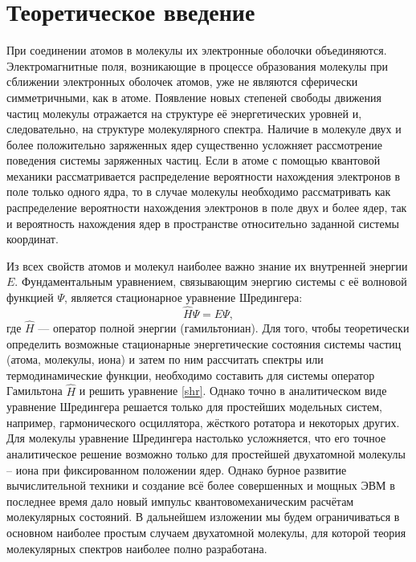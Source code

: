 \section{Теоретическое введение}
При соединении атомов в молекулы их электронные оболочки объединяются.
Электромагнитные поля, возникающие в процессе образования молекулы при
сближении электронных оболочек атомов, уже не являются сферически
симметричными, как в атоме. Появление новых степеней свободы движения
частиц молекулы отражается на структуре её энергетических уровней и,
следовательно, на структуре молекулярного спектра. Наличие в молекуле двух
и более положительно заряженных ядер существенно усложняет рассмотрение
поведения системы заряженных частиц. Если в атоме с помощью квантовой
механики рассматривается распределение вероятности нахождения электронов
в поле только одного ядра, то в случае молекулы необходимо рассматривать
как распределение вероятности нахождения электронов в поле двух и более
ядер, так и вероятность нахождения ядер в пространстве относительно
заданной системы координат.

Из всех свойств атомов и молекул наиболее важно знание их внутренней
энергии $E$. Фундаментальным уравнением, связывающим энергию системы с её
волновой функцией $\Psi$, является стационарное уравнение Шредингера:
\begin{equation}
\label{shr}
\hat H\Psi=E\Psi,
\end{equation}
где $\hat H$ --- оператор полной энергии (гамильтониан). Для того, чтобы
теоретически определить возможные стационарные энергетические состояния
системы частиц (атома, молекулы, иона) и затем по ним рассчитать спектры
или термодинамические функции, необходимо составить для системы оператор
Гамильтона $\hat H$ и решить уравнение \eqref{shr}. Однако точно в аналитическом виде
уравнение Шредингера решается только для простейших модельных систем,
например, гармонического осциллятора, жёсткого ротатора и некоторых
других. Для молекулы уравнение Шредингера настолько усложняется, что его
точное аналитическое решение возможно только для простейшей двухатомной
молекулы – иона при фиксированном положении ядер. Однако бурное
развитие вычислительной техники и создание всё более совершенных и
мощных ЭВМ в последнее время дало новый импульс квантовомеханическим
расчётам молекулярных состояний. В дальнейшем изложении мы будем
ограничиваться в основном наиболее простым случаем двухатомной молекулы,
для которой теория молекулярных спектров наиболее полно разработана.

